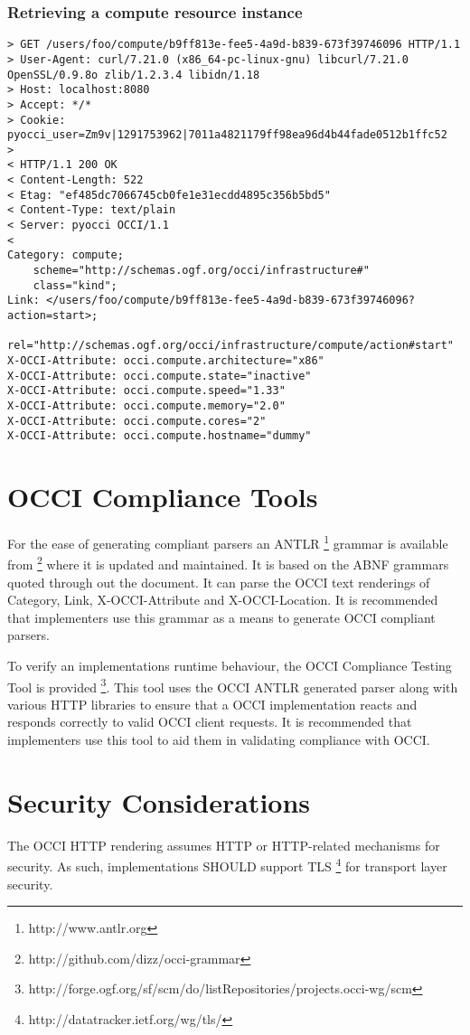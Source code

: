 \documentclass[10pt,a4paper]{article}
\begin{document}
\subsubsection{Retrieving a compute resource instance}
\begin{verbatim}
> GET /users/foo/compute/b9ff813e-fee5-4a9d-b839-673f39746096 HTTP/1.1
> User-Agent: curl/7.21.0 (x86_64-pc-linux-gnu) libcurl/7.21.0 OpenSSL/0.9.8o zlib/1.2.3.4 libidn/1.18
> Host: localhost:8080
> Accept: */*
> Cookie: pyocci_user=Zm9v|1291753962|7011a4821179ff98ea96d4b44fade0512b1ffc52
> 
< HTTP/1.1 200 OK
< Content-Length: 522
< Etag: "ef485dc7066745cb0fe1e31ecdd4895c356b5bd5"
< Content-Type: text/plain
< Server: pyocci OCCI/1.1
< 
Category: compute;
    scheme="http://schemas.ogf.org/occi/infrastructure#"
    class="kind";
Link: </users/foo/compute/b9ff813e-fee5-4a9d-b839-673f39746096?action=start>;
    rel="http://schemas.ogf.org/occi/infrastructure/compute/action#start"
X-OCCI-Attribute: occi.compute.architecture="x86"
X-OCCI-Attribute: occi.compute.state="inactive"
X-OCCI-Attribute: occi.compute.speed="1.33"
X-OCCI-Attribute: occi.compute.memory="2.0"
X-OCCI-Attribute: occi.compute.cores="2"
X-OCCI-Attribute: occi.compute.hostname="dummy"
\end{verbatim}

\section{OCCI Compliance Tools}
For the ease of generating compliant parsers an
ANTLR \footnote{http://www.antlr.org} grammar is available
from \footnote{http://github.com/dizz/occi-grammar} where it is
updated and maintained. It is based on the ABNF grammars quoted
through out the document. It can parse the OCCI text renderings of
Category, Link, X-OCCI-Attribute and X-OCCI-Location. It is
recommended that implementers use this grammar as a means to generate
OCCI compliant parsers.

To verify an implementations runtime behaviour, the OCCI Compliance
Testing Tool is provided
\footnote{http://forge.ogf.org/sf/scm/do/listRepositories/projects.occi-wg/scm}.
This tool uses the OCCI ANTLR generated parser along with various HTTP
libraries to ensure that a OCCI implementation reacts and responds
correctly to valid OCCI client requests. It is recommended that
implementers use this tool to aid them in validating compliance with
OCCI.

\section{Security Considerations}
\label{sec:sec_consid}
The OCCI HTTP rendering assumes HTTP or HTTP-related mechanisms for
security. As such, implementations SHOULD support
TLS \footnote{http://datatracker.ietf.org/wg/tls/} for transport layer
security.
\end{document}
